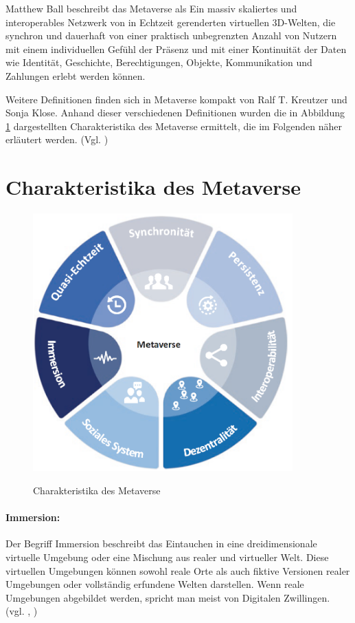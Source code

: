 Matthew Ball beschreibt das Metaverse als \glqq Ein massiv skaliertes und interoperables Netzwerk von in Echtzeit gerenderten virtuellen 3D-Welten, die synchron und dauerhaft von einer praktisch unbegrenzten Anzahl von Nutzern mit einem individuellen Gefühl der Präsenz und mit einer Kontinuität der Daten wie Identität, Geschichte, Berechtigungen, Objekte, Kommunikation und Zahlungen erlebt werden können.\grqq{} \cite{Ball22Def}

Weitere Definitionen finden sich in \glqq Metaverse kompakt\grqq{} von Ralf T. Kreutzer und Sonja Klose. Anhand dieser verschiedenen Definitionen wurden die in Abbildung \ref{fig:CharakteristikadesMV} dargestellten Charakteristika des Metaverse ermittelt, die im Folgenden näher erläutert werden. (Vgl. \cite{MVkompaktDef})  

\section{Charakteristika des Metaverse}

\begin{figure}[!h]
    \centering
    \includegraphics[width = 10cm]{figures/CharakteristikadesMV.png}
    \caption{Charakteristika des Metaverse}
    \cite{MVkompaktDef}
    \label{fig:CharakteristikadesMV}
\end{figure}

\paragraph{Immersion:} Der Begriff Immersion beschreibt das \glqq Eintauchen\grqq{} in eine dreidimensionale virtuelle Umgebung oder eine Mischung aus realer und virtueller Welt. Diese virtuellen Umgebungen können sowohl reale Orte als auch fiktive Versionen realer Umgebungen oder vollständig erfundene Welten darstellen. Wenn reale Umgebungen abgebildet werden, spricht man meist von Digitalen Zwillingen. (vgl. \cite{Ball22charak}, \cite{MVkompaktCharak})

